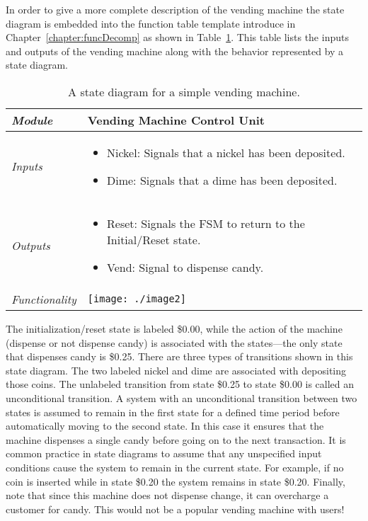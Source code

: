 In order to give a more complete description of the vending machine the
state diagram is embedded into the function table template introduce in
Chapter~\ref{chapter:funcDecomp} as 
shown in Table~\ref{table:stateVendingMachine}.
 This table lists the inputs and outputs
of the vending machine along with the behavior represented by a state
diagram.

\begin{table}[h]
\caption{A state diagram for a simple vending machine.}
\label{table:stateVendingMachine}
\begin{tabular}{|l|m{10cm}|}
\hline
\emph{Module} &Vending Machine Control Unit \\ \hline
\emph{Inputs} & 
\begin{itemize}
\item
  Nickel: Signals that a nickel has been deposited.
\item
  Dime: Signals that a dime has been deposited.
\end{itemize} \\ \hline

\emph{Outputs} & 
\begin{itemize}
\item
  Reset: Signals the FSM to return to the Initial/Reset state.
\item
  Vend: Signal to dispense candy.
\end{itemize} \\ \hline
\emph{Functionality} &
\texttt{[image: ./image2]} \\ \hline
\end{tabular}
\end{table}


The initialization/reset state is labeled \$0.00, while the action of
the machine (dispense or not dispense candy) is associated with the
states---the only state that dispenses candy is \$0.25. There are three
types of transitions shown in this state diagram. The two labeled nickel
and dime are associated with depositing those coins. The unlabeled
transition from state \$0.25 to state \$0.00 is called an unconditional
transition. A system with an unconditional transition between two states
is assumed to remain in the first state for a defined time period before
automatically moving to the second state. In this case it ensures that
the machine dispenses a single candy before going on to the next
transaction. It is common practice in state diagrams to assume that any
unspecified input conditions cause the system to remain in the current
state. For example, if no coin is inserted while in state \$0.20 the
system remains in state \$0.20. Finally, note that since this machine
does not dispense change, it can overcharge a customer for candy. This
would not be a popular vending machine with users!

